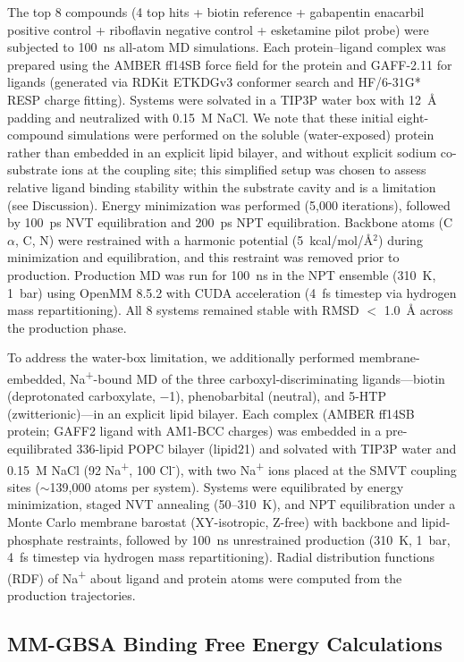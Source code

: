 \documentclass[10pt,letterpaper]{article}
\begin{document}
The top 8 compounds (4 top hits + biotin reference + gabapentin enacarbil positive control + riboflavin negative control + esketamine pilot probe) were subjected to 100~ns all-atom MD simulations. Each protein--ligand complex was prepared using the AMBER ff14SB force field for the protein and GAFF-2.11 for ligands (generated via RDKit ETKDGv3 conformer search and HF/6-31G* RESP charge fitting). Systems were solvated in a TIP3P water box with 12~\AA{} padding and neutralized with 0.15~M NaCl. We note that these initial eight-compound simulations were performed on the soluble (water-exposed) protein rather than embedded in an explicit lipid bilayer, and without explicit sodium co-substrate ions at the coupling site; this simplified setup was chosen to assess relative ligand binding stability within the substrate cavity and is a limitation (see Discussion). Energy minimization was performed (5,000 iterations), followed by 100~ps NVT equilibration and 200~ps NPT equilibration. Backbone atoms (C$\alpha$, C, N) were restrained with a harmonic potential (5~kcal/mol/\AA{}$^2$) during minimization and equilibration, and this restraint was removed prior to production. Production MD was run for 100~ns in the NPT ensemble (310~K, 1~bar) using OpenMM 8.5.2 with CUDA acceleration (4~fs timestep via hydrogen mass repartitioning). All 8 systems remained stable with RMSD $<$ 1.0~\AA{} across the production phase.

To address the water-box limitation, we additionally performed membrane-embedded, Na\textsuperscript{+}-bound MD of the three carboxyl-discriminating ligands---biotin (deprotonated carboxylate, $-$1), phenobarbital (neutral), and 5-HTP (zwitterionic)---in an explicit lipid bilayer. Each complex (AMBER ff14SB protein; GAFF2 ligand with AM1-BCC charges) was embedded in a pre-equilibrated 336-lipid POPC bilayer (lipid21) and solvated with TIP3P water and 0.15~M NaCl (92 Na\textsuperscript{+}, 100 Cl\textsuperscript{-}), with two Na\textsuperscript{+} ions placed at the SMVT coupling sites ($\sim$139,000 atoms per system). Systems were equilibrated by energy minimization, staged NVT annealing (50--310~K), and NPT equilibration under a Monte Carlo membrane barostat (XY-isotropic, Z-free) with backbone and lipid-phosphate restraints, followed by 100~ns unrestrained production (310~K, 1~bar, 4~fs timestep via hydrogen mass repartitioning). Radial distribution functions (RDF) of Na\textsuperscript{+} about ligand and protein atoms were computed from the production trajectories.

\subsection*{MM-GBSA Binding Free Energy Calculations}
\end{document}
